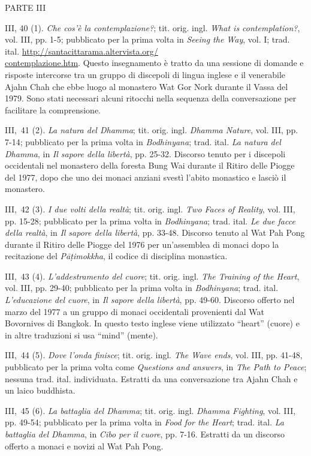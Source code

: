 PARTE III

III, 40 (1). \emph{Che cos'è la contemplazione?}; tit. orig. ingl.
\emph{What is contemplation?}, vol. III, pp. 1-5; pubblicato per la
prima volta in \emph{Seeing the Way}, vol. I; trad. ital.
\href{http://santacittarama.altervista.org/contemplazione.htm}{http://santacittarama.altervista.org/\\
contemplazione.htm}. Questo insegnamento è tratto da una sessione di
domande e risposte intercorse tra un gruppo di discepoli di lingua
inglese e il venerabile Ajahn Chah che ebbe luogo al monastero Wat Gor
Nork durante il Vassa del 1979. Sono stati necessari alcuni ritocchi
nella sequenza della conversazione per facilitare la comprensione.

III,~41 (2). \emph{La natura del Dhamma}; tit. orig. ingl. \emph{Dhamma
Nature}, vol. III, pp. 7-14; pubblicato per la prima volta in
\emph{Bodhinyana}; trad. ital. \emph{La natura del Dhamma}, in \emph{Il
sapore della libertà}, pp. 25-32. Discorso tenuto per i discepoli
occidentali nel monastero della foresta Bung Wai durante il Ritiro delle
Piogge del 1977, dopo che uno dei monaci anziani svestì l'abito
monastico e lasciò il monastero.

III,~42 (3). \emph{I due volti della realtà}; tit. orig. ingl. \emph{Two
Faces of Reality}, vol. III, pp. 15-28; pubblicato per la prima volta in
\emph{Bodhinyana}; trad. ital. \emph{Le due facce della realtà}, in
\emph{Il sapore della libertà}, pp. 33-48. Discorso tenuto al Wat Pah
Pong durante il Ritiro delle Piogge del 1976 per un'assemblea di monaci
dopo la recitazione del \emph{Pāṭimokkha}, il codice di disciplina
monastica.

III,~43 (4). \emph{L'addestramento del cuore}; tit. orig. ingl.
\emph{The Training of the Heart}, vol. III, pp. 29-40; pubblicato per la
prima volta in \emph{Bodhinyana}; trad. ital. \emph{L'educazione del
cuore}, in \emph{Il sapore della libertà}, pp. 49-60. Discorso offerto
nel marzo del 1977 a un gruppo di monaci occidentali provenienti dal Wat
Bovornives di Bangkok. In questo testo inglese viene utilizzato
``heart'' (cuore) e in altre traduzioni si usa ``mind'' (mente).

III,~44 (5). \emph{Dove l'onda finisce}; tit. orig. ingl. \emph{The Wave
ends}, vol. III, pp. 41-48, pubblicato per la prima volta come
\emph{Questions and answers}, in \emph{The Path to Peace}; nessuna trad.
ital. individuata. Estratti da una conversazione tra Ajahn Chah e un
laico buddhista.

III,~45 (6). \emph{La battaglia del Dhamma}; tit. orig. ingl.
\emph{Dhamma Fighting}, vol. III, pp. 49-54; pubblicato per la prima
volta in \emph{Food for the Heart}; trad. ital. \emph{La battaglia del
Dhamma}, in \emph{Cibo per il cuore}, pp. 7-16. Estratti da un discorso
offerto a monaci e novizi al Wat Pah Pong.


